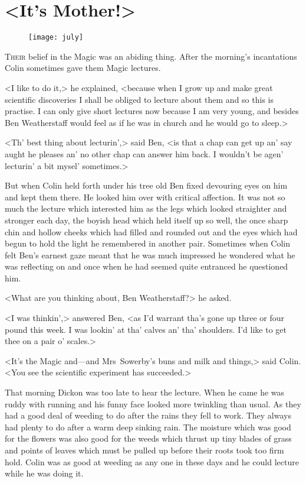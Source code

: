 \chapter{<It's Mother!>} 
	
\begin{figure}[t!]
\centering
\texttt{[image: july]}
\end{figure}

 \lettrine[]{T}{heir} belief in the Magic was an abiding thing. After the morning's incantations Colin sometimes gave them Magic lectures.

\zz
<I like to do it,> he explained, <because when I grow up and make great scientific discoveries I shall be obliged to lecture about them and so this is practise. I can only give short lectures now because I am very young, and besides Ben Weatherstaff would feel as if he was in church and he would go to sleep.>

<Th' best thing about lecturin',> said Ben, <is that a chap can get up an' say aught he pleases an' no other chap can answer him back. I wouldn't be agen' lecturin' a bit mysel' sometimes.>

But when Colin held forth under his tree old Ben fixed devouring eyes on him and kept them there. He looked him over with critical affection. It was not so much the lecture which interested him as the legs which looked straighter and stronger each day, the boyish head which held itself up so well, the once sharp chin and hollow cheeks which had filled and rounded out and the eyes which had begun to hold the light he remembered in another pair. Sometimes when Colin felt Ben's earnest gaze meant that he was much impressed he wondered what he was reflecting on and once when he had seemed quite entranced he questioned him.

<What are you thinking about, Ben Weatherstaff?> he asked.

<I was thinkin',> answered Ben, <as I'd warrant tha's gone up three or four pound this week. I was lookin' at tha' calves an' tha' shoulders. I'd like to get thee on a pair o' scales.>

<It's the Magic and—and Mrs~Sowerby's buns and milk and things,> said Colin. <You see the scientific experiment has succeeded.>

That morning Dickon was too late to hear the lecture. When he came he was ruddy with running and his funny face looked more twinkling than usual. As they had a good deal of weeding to do after the rains they fell to work. They always had plenty to do after a warm deep sinking rain. The moisture which was good for the flowers was also good for the weeds which thrust up tiny blades of grass and points of leaves which must be pulled up before their roots took too firm hold. Colin was as good at weeding as any one in these days and he could lecture while he was doing it.

